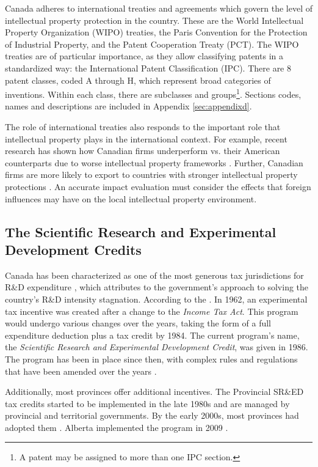 \documentclass[../main.tex]{subfiles}
\begin{document}
Canada adheres to international treaties and agreements which govern the level of intellectual property protection in the country. These are the World Intellectual Property Organization (WIPO) treaties, the Paris Convention for the Protection of Industrial Property, and the Patent Cooperation Treaty (PCT). The WIPO treaties are of particular importance, as they allow classifying patents in a standardized way: the International Patent Classification (IPC). There are 8 patent classes, coded A through H, which represent broad categories of inventions. Within each class, there are subclasses and groups\footnote{A patent may be assigned to more than one IPC section.}. Sections codes, names and descriptions are included in Appendix \ref{sec:appendixd}.
 
The role of international treaties also responds to the important role that intellectual property plays in the international context. For example, recent research has shown how Canadian firms underperform vs. their American counterparts due to worse intellectual property frameworks \parencite{carew_etal06}. Further, Canadian firms are more likely to export to countries with stronger intellectual property protections \parencite{rafiquzzaman02}. An accurate impact evaluation must consider the effects that foreign influences may have on the local intellectual property environment.

\subsection{The Scientific Research and Experimental Development Credits}

Canada has been characterized as one of the most generous tax jurisdictions for R\&D expenditure \parencite{mckenzie08, mansfield_switzer85b}, which \textcite{mckenzie05} attributes to the government's approach to solving the country's R\&D intensity stagnation. According to the \textcite{canadarevenueagency23}. In 1962, an experimental tax incentive was created after a change to the \textit{Income Tax Act}. This program would undergo various changes over the years, taking the form of a full expenditure deduction plus a tax credit by 1984. The current program's name, the \textit{Scientific Research and Experimental Development Credit}, was given in 1986. The program has been in place since then, with complex rules and regulations that have been amended over the years \parencite{canadarevenueagency15}.

Additionally, most provinces offer additional incentives. The Provincial SR\&ED tax credits started to be implemented in the late 1980s and are managed by provincial and territorial governments. By the early 2000s, most provinces had adopted them \parencite{warda00, warda98,mckenzie05}. Alberta implemented the program in 2009 \parencite{brouillete13}.
\end{document}

